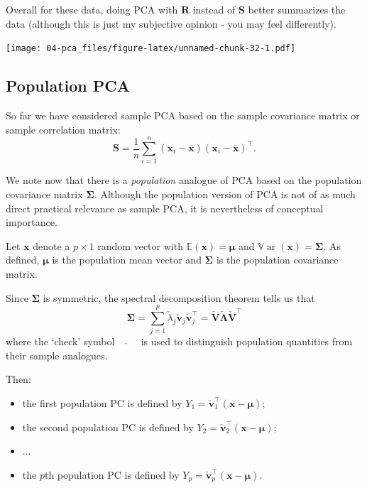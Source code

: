 \documentclass[]{book}
\providecommand{\tightlist}{%
  \setlength{\itemsep}{0pt}\setlength{\parskip}{0pt}}
\theoremstyle{definition}
\theoremstyle{definition}
\theoremstyle{definition}
\theoremstyle{remark}
\begin{document}
Overall for these data, doing PCA with \(\mathbf R\) instead of \(\mathbf S\) better summarizes the data (although this is just my subjective opinion - you may feel differently).

\texttt{[image: 04-pca\_files/figure-latex/unnamed-chunk-32-1.pdf]}

\hypertarget{population-pca}{%
\subsection{Population PCA}\label{population-pca}}

So far we have considered sample PCA based on the sample covariance matrix or sample correlation matrix:
\[
\mathbf S=\frac{1}{n}\sum_{i=1}^n (\mathbf x_i-\bar{\mathbf x})(\mathbf x_i-\bar{\mathbf x})^\top.
\]

We note now that there is a \emph{population} analogue of PCA based on the population
covariance matrix \(\boldsymbol{\Sigma}\). Although the population version of PCA is not of as much direct practical
relevance as sample PCA, it is nevertheless of conceptual importance.

Let \(\mathbf x\) denote a \(p \times 1\) random vector with \({\mathbb{E}}(\mathbf x)={\pmb \mu}\) and \({\mathbb{V}\operatorname{ar}}(\mathbf x)={\pmb \Sigma}\). As defined,
\(\pmb \mu\) is the population mean vector and \(\pmb \Sigma\) is the population covariance matrix.

Since \(\pmb \Sigma\) is symmetric, the spectral decomposition theorem tells us that
\[
{\pmb \Sigma}=\sum_{j=1}^p \check{\lambda}_j \check{\mathbf v}_j \check{\mathbf v}_j^\top=\check{\mathbf V} \check{\boldsymbol \Lambda}\check{\mathbf V}^\top
\]
where the `check' symbol \(\quad \check{} \quad\) is used to distinguish population quantities from their sample analogues.

Then:

\begin{itemize}
\tightlist
\item
  the first population PC is defined by \(Y_1=\check{\mathbf v}_1^\top (\mathbf x-{\pmb \mu})\);
\item
  the second population PC is defined by \(Y_2=\check{\mathbf v}_2^\top (\mathbf x-{\pmb \mu})\);
\item
  \(\ldots\)
\item
  the \(p\)th population PC is defined by \(Y_p=\check{\mathbf v}_p^\top (\mathbf x-{\pmb \mu})\).
\end{itemize}
\end{document}
